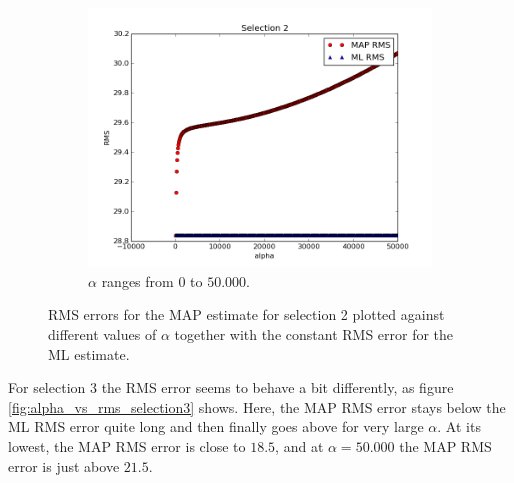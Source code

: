 \documentclass[a4paper]{article}
\begin{document}
\begin{figure}[H]
\begin{adjustwidth}{-7em}{-7em}
    \begin{subfigure}{.32\linewidth}
      \includegraphics[width=\linewidth]{figures/alpha_vs_rms_selection2c.png}
      \caption{$\alpha$ ranges from $0$ to $50.000$.}
      \label{fig:alpha_vs_rms_selection2c}
    \end{subfigure}
  \end{adjustwidth}
  \caption{RMS errors for the MAP estimate for selection 2 plotted against different values of $\alpha$ together with the constant RMS error for the ML estimate.}
  \label{fig:alpha_vs_rms_selection2}
\end{figure}

For selection 3 the RMS error seems to behave a bit differently, as figure \ref{fig:alpha_vs_rms_selection3} shows. Here, the MAP RMS error stays below the ML RMS error quite long and then finally goes above for very large $\alpha$. At its lowest, the MAP RMS error is close to $18.5$, and at $\alpha = 50.000$ the MAP RMS error is just above $21.5$.
\end{document}
